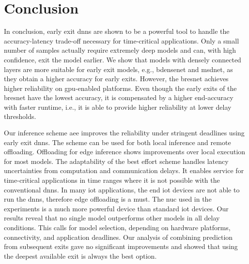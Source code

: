 \hypertarget{conclusion}{%
\chapter{Conclusion}\label{ch:conclusion}}


In conclusion, early exit \gls{dnn}s are shown to be a powerful tool to handle the accuracy-latency trade-off necessary for time-critical applications. Only a small number of samples actually require extremely deep models and can, with high confidence, exit the model earlier. We show that models with densely connected layers are more suitable for early exit models, e.g., \gls{bdensenet} and \gls{msdnet}, as they obtain a higher accuracy for early exits. However, the \gls{bresnet} achieves higher reliability on \gls{gpu}-enabled platforms. Even though the early exits of the \gls{bresnet} have the lowest accuracy, it is compensated by a higher end-accuracy with faster runtime, i.e., it is able to provide higher reliability at lower delay thresholds.

Our inference scheme \gls{aee} improves the reliability under stringent deadlines using early exit \gls{dnn}s. The scheme can be used for both local inference and remote offloading. Offloading for edge inference shows improvements over local execution for most models. The adaptability of the best effort scheme handles latency uncertainties from computation and communication delays. It enables service for time-critical applications in time ranges where it is not possible with the conventional \gls{dnn}s. In many \gls{iot} applications, the end \gls{iot} devices are not able to run the \gls{dnn}s, therefore edge offloading is a must. The \gls{nuc} used in the experiments is a much more powerful device than standard \gls{iot} devices. Our results reveal that no single model outperforms other models in all delay conditions. This calls for model selection, depending on hardware platforms, connectivity, and application deadlines. Our analysis of combining prediction from subsequent exits gave no significant improvements and showed that using the deepest available exit is always the best option.



